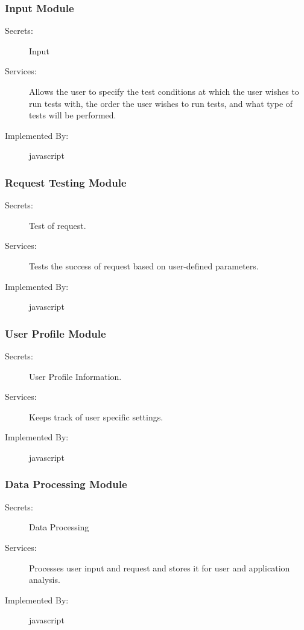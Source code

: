 \documentclass[12pt, titlepage]{article}
\begin{document}
\subsubsection{Input Module}
\begin{description}
\item[Secrets:] Input
\item[Services:] Allows the user to specify the test conditions at which the user wishes to run tests with, the order the user wishes to run tests, and what type of tests will be performed.
\item[Implemented By:] javascript
\end{description}

\subsubsection{Request Testing Module}
\begin{description}
\item[Secrets:] Test of request.
\item[Services:] Tests the success of request based on user-defined parameters.
\item[Implemented By:] javascript
\end{description}

\subsubsection{User Profile Module}
\begin{description}
\item[Secrets:] User Profile Information.
\item[Services:] Keeps track of user specific settings.
\item[Implemented By:] javascript
\end{description}

\subsubsection{Data Processing Module}
\begin{description}
\item[Secrets:] Data Processing
\item[Services:] Processes user input and request 	 and stores it for user and application analysis.
\item[Implemented By:] javascript
\end{description}
\end{document}
